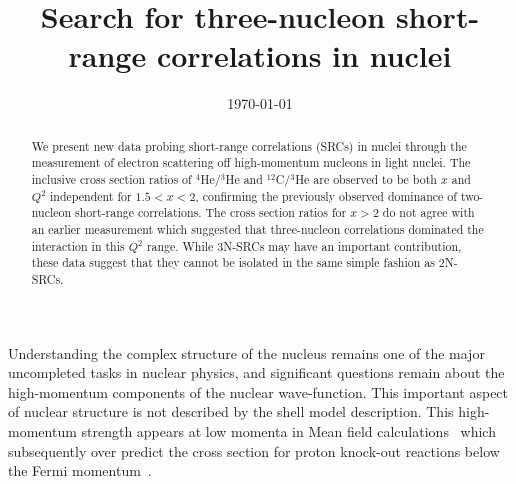 \documentclass[aps,prl,superscriptaddress,showpacs,twocolumn,floatfix,amsmath,amssymb]{revtex4-1}
\begin{document}
\title{Search for three-nucleon short-range correlations in nuclei}



\date{\today}

\begin{abstract}

We present new data probing short-range correlations (SRCs) in nuclei through the measurement of electron scattering off high-momentum nucleons in
light nuclei. The inclusive cross section ratios of $^4$He/$^3$He and $^{12}$C/$^3$He are observed to be both $x$ and $Q^2$ independent
for $1.5 < x <2$, confirming the previously observed dominance of two-nucleon short-range correlations. The cross section ratios for
$x > 2$ do not agree with an earlier measurement which suggested that three-nucleon correlations dominated the interaction in this $Q^2$ range.
While 3N-SRCs may have an important contribution, these data suggest that they cannot be isolated in the same simple fashion as 2N-SRCs.

\end{abstract}

\maketitle

%

Understanding the complex structure of the nucleus remains one of the major uncompleted tasks in nuclear physics, and significant questions remain about the high-momentum components of the nuclear wave-function. This important aspect of nuclear structure is not described by the shell model description. This high-momentum strength appears at low momenta in Mean field calculations~\cite{DeForest1983} which subsequently over predict the cross section for proton knock-out reactions below the Fermi momentum~\cite{VanDerSteenhoven1988547, Lapikas1993297, Kelly:1996hd}.



\end{document}
